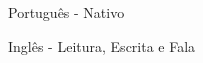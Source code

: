 
\begin{cventries}
  \cventry
  {}
  {
    \begin{cvitems} %
      \item {Português - Nativo}
      \item {Inglês - Leitura, Escrita e Fala }
    \end{cvitems}
  }
  {} {} {}

\end{cventries}